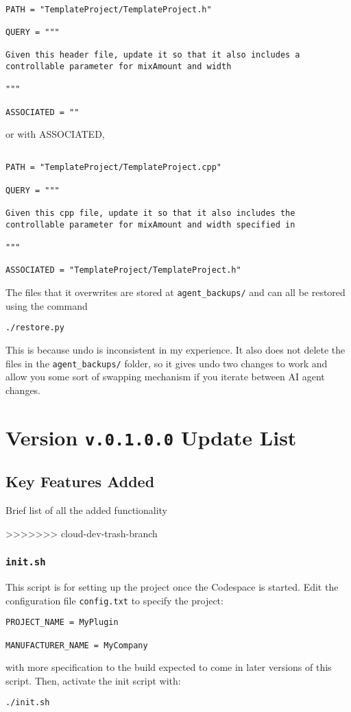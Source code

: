 \documentclass[twocolumn,natbib]{svjour3}        %
\begin{document}
\begin{verbatim}

PATH = "TemplateProject/TemplateProject.h"

QUERY = """

Given this header file, update it so that it also includes a controllable parameter for mixAmount and width

"""

ASSOCIATED = ""

\end{verbatim}
or with ASSOCIATED,
\begin{verbatim}

PATH = "TemplateProject/TemplateProject.cpp"

QUERY = """

Given this cpp file, update it so that it also includes the controllable parameter for mixAmount and width specified in 

"""

ASSOCIATED = "TemplateProject/TemplateProject.h"

\end{verbatim}

The files that it overwrites are stored at \texttt{agent\_backups/} and can all be restored using the command 
\begin{lstlisting}
./restore.py
\end{lstlisting}
This is because undo is inconsistent in my experience. It also does not delete the files in the \texttt{agent\_backups/} folder, so it gives undo two changes to work and allow you some sort of swapping mechanism if you iterate between AI agent changes.

\section{Version \texttt{v.0.1.0.0} Update List}
\subsection{Key Features Added}
Brief list of all the added functionality

>>>>>>> cloud-dev-trash-branch
\subsubsection{\texttt{init.sh}}
This script is for setting up the project once the Codespace is started. Edit the configuration file \texttt{config.txt} to specify the project:
\begin{verbatim}
PROJECT_NAME = MyPlugin

MANUFACTURER_NAME = MyCompany
\end{verbatim}
with more specification to the build expected to come in later versions of this script.
Then, activate the init script with:
\begin{lstlisting}
./init.sh
\end{lstlisting}
\end{document}
